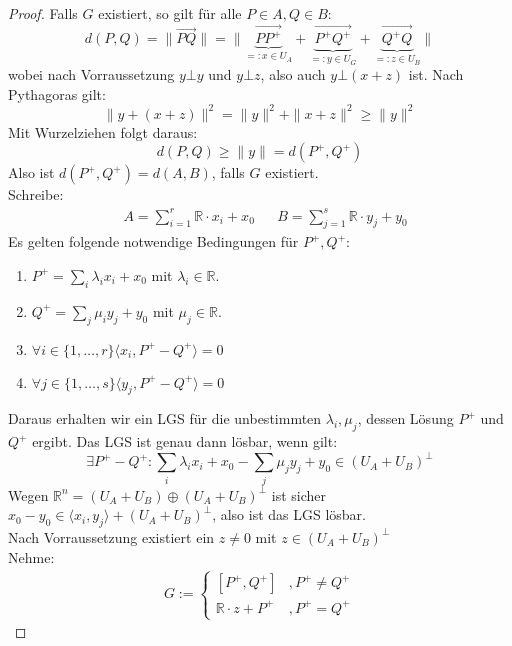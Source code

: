 \documentclass[parskip,a4paper,twoside,DIV15,BCOR12mm]{scrbook}
\begin{document}
\begin{proof}
Falls $G$ existiert, so gilt für alle $P\in A,Q\in B$:
\[d(P,Q)=\|\overrightarrow{PQ}\|=\|\underbrace{\overrightarrow{PP^+}}_{=:x\in U_A}+\underbrace{\overrightarrow{P^+Q^+}}_{=:y\in U_G}+\underbrace{\overrightarrow{Q^+Q}}_{=:z\in U_B}\|\]
wobei nach Vorraussetzung $y\bot y$ und $y \bot z$, also auch $y \bot (x+z)$ ist.
Nach Pythagoras gilt:
\[\|y+(x+z)\|^2=\|y\|^2+\|x+z\|^2\ge \|y\|^2\]
Mit Wurzelziehen folgt daraus:
\[d(P,Q)\ge \|y\|=d(P^+,Q^+)\]
Also ist $d(P^+,Q^+)=d(A,B)$, falls $G$ existiert.\\
Schreibe:
\begin{align*}
&A=\sum_{i=1}^r \mathbb{R}\cdot x_i+x_0 &&B=\sum_{j=1}^s \mathbb{R}\cdot y_j +y_0
\end{align*}
Es gelten folgende notwendige Bedingungen für $P^+,Q^+$:	
\begin{enumerate}
\item $P^+=\sum_{i}\lambda_i x_i+x_0$ mit $\lambda_i\in\mathbb{R}$.
\item $Q^+=\sum_{j}\mu_i y_j+y_0$ mit $\mu_j\in\mathbb{R}$.
\item $\forall i\in\{1,\ldots,r\}\langle x_i,P^+-Q^+\rangle = 0$
\item $\forall j\in\{1,\ldots,s\}\langle y_j,P^+-Q^+\rangle = 0$
\end{enumerate}
Daraus erhalten wir ein LGS für die unbestimmten $\lambda_i,\mu_j$, dessen
Lösung $P^+$ und $Q^+$ ergibt.
Das LGS ist genau dann lösbar, wenn gilt:
\[\exists P^+-Q^+:\sum_i \lambda_ix_i+x_0-\sum_j \mu_jy_j+y_0\in (U_A+U_B)^\bot\]
Wegen $\mathbb{R}^n=(U_A+U_B)\oplus(U_A+U_B)^\bot$ ist sicher
$x_0-y_0\in\langle x_i,y_j\rangle+(U_A+U_B)^\bot$, also ist das LGS lösbar.\\
Nach Vorraussetzung existiert ein $z\ne 0$ mit $z\in(U_A+U_B)^\bot$\\
Nehme:
\begin{align*}
G:=
\begin{cases}
[P^+,Q^+] &,P^+\ne Q^+\\
\mathbb{R}\cdot z+P^+ &,P^+=Q^+
\end{cases}
\end{align*}
\end{proof}

\begin{comment}
Sei $\{b_1,\ldots,b_t\}$ ONB von $(U_A+U_B)^\bot$. Dann gilt mit $\beta_\tau=\langle x_0-y_0, b_\tau\rangle$:
\[P^+-Q^+=\sum_{\tau=1}^t \beta_\tau\cdot b_\tau\]
Dann erhalten wir zwei Methoden zur Abstandsbestimmung:
\begin{enumerate}
\item Löse das LGS in $\lambda_i,\mu_j$!
\item Bestimme eine ONB $\{b_1,\ldots,b_t\}$ von $(U_A+U_B)\bot$, dann gilt:
\[d(A,B)\left(=\|P^+-Q^+\|\right) =\sqrt{\sum_{\tau=1}^t \langle x_0-y_0,b_\tau\rangle^2}\]
Diese Methode kommt \textbf{ohne} Berechnung von $P^+,Q^+$ aus.
\end{enumerate}
\end{comment}
\end{document}
